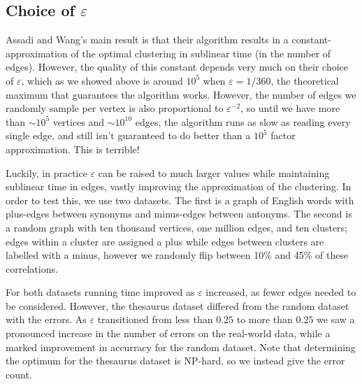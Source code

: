 \documentclass[
]{article}
\begin{document}
\hypertarget{choice-of-varepsilon}{%
  \subsection{\texorpdfstring{Choice of
        {\(\varepsilon\)}}{Choice of \textbackslash varepsilon}}\label{choice-of-varepsilon}}

Assadi and Wang's main result is that their algorithm
results in a constant-approximation of the optimal clustering in
sublinear time (in the number of edges). However, the quality of this constant depends very much
on their choice of {\(\varepsilon\)}, which as we showed above is around $10^5$ when $\varepsilon = 1/360$, the theoretical maximum that guarantees the algorithm works. However, the number of edges we randomly sample per vertex is also proportional to $\varepsilon^{-2}$, so until we have more than $\sim 10^{5}$ vertices and $\sim 10^{10}$ edges, the algorithm runs as slow as reading every single edge, and still isn't guaranteed to do better than a $10^5$ factor approximation. This is terrible!

Luckily, in practice {\(\varepsilon\)} can be raised to much larger
values while maintaining sublinear time in edges, vastly improving the
approximation of the clustering. In order to test this, we use two
datasets. The first is a graph of English words with plus-edges between
synonyms and minus-edges between antonyms. The second is a random graph
with ten thousand vertices, one million edges, and ten clusters; edges
within a cluster are assigned a plus while edges between clusters are
labelled with a minus, however we randomly flip between 10\% and 45\% of
these correlations.

For both datasets running time improved as {\(\varepsilon\)} increased,
as fewer edges needed to be considered. However, the thesaurus dataset
differed from the random dataset with the errors. As {\(\varepsilon\)}
transitioned from less than {\(0.25\)} to more than {\(0.25\)} we saw a
pronounced increase in the number of errors on the real-world data,
while a marked improvement in accurracy for the random dataset. Note
that determining the optimum for the thesaurus dataset is NP-hard, so we
instead give the error count.
\end{document}
